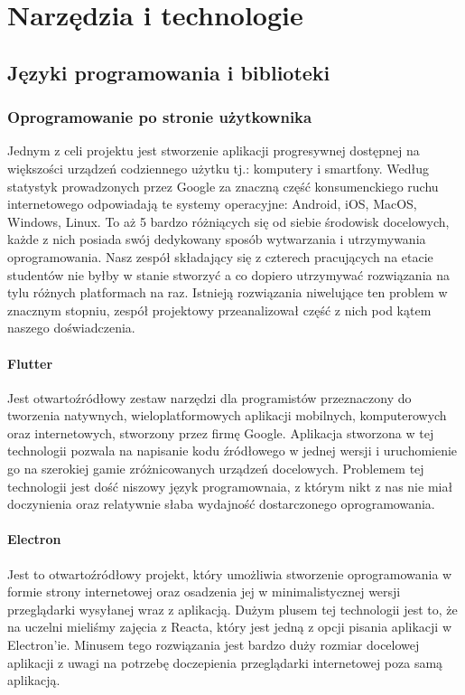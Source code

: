 
\section{Narzędzia i technologie}
\label{sec:narzedzia-i-technologie}

\subsection{Języki programowania i biblioteki}
\label{subsec:jezyki-programowania-i-biblioteki}

\subsubsection{Oprogramowanie po stronie użytkownika}
Jednym z celi projektu jest stworzenie aplikacji progresywnej dostępnej na większości urządzeń codziennego użytku tj.: komputery i smartfony.
Według statystyk prowadzonych przez Google za znaczną część konsumenckiego ruchu internetowego odpowiadają te systemy operacyjne: Android, iOS, MacOS, Windows, Linux.
To aż 5 bardzo różniących się od siebie środowisk docelowych, każde z nich posiada swój dedykowany sposób wytwarzania i utrzymywania oprogramowania.
Nasz zespół składający się z czterech pracujących na etacie studentów nie byłby w stanie stworzyć a co dopiero utrzymywać rozwiązania na tylu różnych platformach na raz.
Istnieją rozwiązania niwelujące ten problem w znacznym stopniu, zespół projektowy przeanalizował część z nich pod kątem naszego doświadczenia.

\paragraph{Flutter}
Jest otwartoźródłowy zestaw narzędzi dla programistów przeznaczony do tworzenia natywnych, wieloplatformowych aplikacji mobilnych, komputerowych oraz internetowych, stworzony przez firmę Google.
Aplikacja stworzona w tej technologii pozwala na napisanie kodu źródłowego w jednej wersji i uruchomienie go na szerokiej gamie zróżnicowanych urządzeń docelowych.
Problemem tej technologii jest dość niszowy język programownaia, z którym nikt z nas nie miał doczynienia oraz relatywnie słaba wydajność dostarczonego oprogramowania.

\paragraph{Electron}
Jest to otwartoźródłowy projekt, który umożliwia stworzenie oprogramowania w formie strony internetowej oraz osadzenia jej w minimalistycznej wersji przeglądarki wysyłanej wraz z aplikacją.
Dużym plusem tej technologii jest to, że na uczelni mieliśmy zajęcia z Reacta, który jest jedną z opcji pisania aplikacji w Electron'ie.
Minusem tego rozwiązania jest bardzo duży rozmiar docelowej aplikacji z uwagi na potrzebę doczepienia przeglądarki internetowej poza samą aplikacją.

